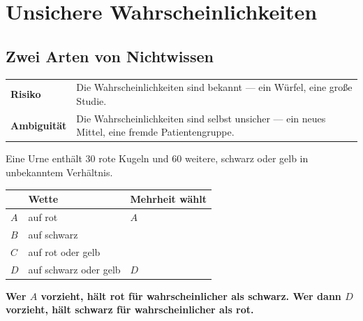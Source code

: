 \chapter{Unsichere Wahrscheinlichkeiten}

\section{Zwei Arten von Nichtwissen}

\begin{merksatz}
\begin{center}
{\small
\renewcommand{\arraystretch}{1.55}
\begin{tabular}{@{}P{2.4cm}P{6.2cm}@{}}
\toprule
\textbf{Risiko} & Die Wahrscheinlichkeiten sind bekannt --- ein Würfel, eine große Studie.\\
\textbf{Ambiguität} & Die Wahrscheinlichkeiten sind selbst unsicher --- ein neues Mittel, eine fremde Patientengruppe.\\
\bottomrule
\end{tabular}}
\end{center}

Eine Urne enthält $30$ rote Kugeln und $60$ weitere, schwarz oder gelb in unbekanntem Verhältnis.

\begin{center}
{\small
\renewcommand{\arraystretch}{1.48}
\begin{tabular}{@{}P{1.4cm}P{3.0cm}P{3.4cm}@{}}
\toprule
& \textbf{Wette} & \textbf{Mehrheit wählt}\\
\midrule
$A$ & auf rot & \textcolor{gruen}{$A$}\\
$B$ & auf schwarz & \\
\midrule
$C$ & auf rot oder gelb & \\
$D$ & auf schwarz oder gelb & \textcolor{gruen}{$D$}\\
\bottomrule
\end{tabular}}
\end{center}

\begin{center}
\begin{minipage}{0.9\textwidth}
\textbf{Wer $A$ vorzieht, hält rot für wahrscheinlicher als schwarz. Wer dann $D$ vorzieht, hält schwarz für wahrscheinlicher als rot.}
\end{minipage}
\end{center}

\begin{center}
\begin{minipage}{0.88\textwidth}
\end{minipage}
\end{center}
\end{merksatz}

